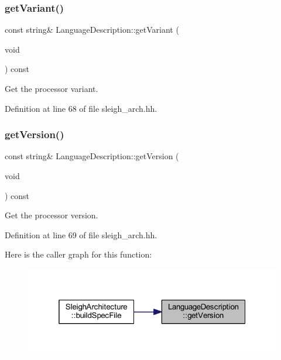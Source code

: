 \subsubsection{\texorpdfstring{getVariant()}{getVariant()}}
{\footnotesize\ttfamily const string\& Language\+Description\+::get\+Variant (\begin{DoxyParamCaption}\item[{void}]{ }\end{DoxyParamCaption}) const\hspace{0.3cm}{\ttfamily [inline]}}



Get the processor variant. 



Definition at line 68 of file sleigh\+\_\+arch.\+hh.

\mbox{\label{class_language_description_aa3a1f6a0d66bd5f9a6d8659a1c3cb87d}} 
\subsubsection{\texorpdfstring{getVersion()}{getVersion()}}
{\footnotesize\ttfamily const string\& Language\+Description\+::get\+Version (\begin{DoxyParamCaption}\item[{void}]{ }\end{DoxyParamCaption}) const\hspace{0.3cm}{\ttfamily [inline]}}



Get the processor version. 



Definition at line 69 of file sleigh\+\_\+arch.\+hh.

Here is the caller graph for this function\+:
\nopagebreak
\begin{figure}[H]
\begin{center}
\leavevmode
\includegraphics[width=319pt]{class_language_description_aa3a1f6a0d66bd5f9a6d8659a1c3cb87d_icgraph}
\end{center}
\end{figure}
\mbox{\label{class_language_description_a80a70fcdeb1c63c3d3a55a65a3fa97ca}} 
